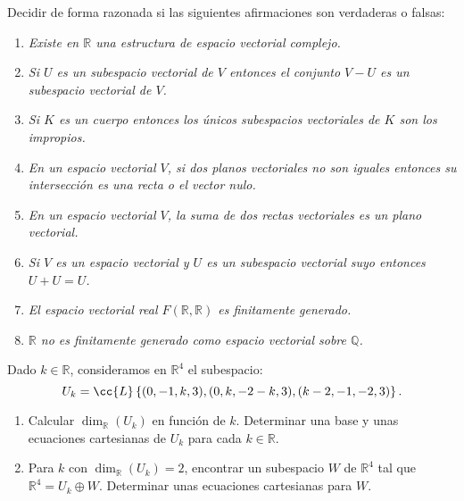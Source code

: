 \begin{ejercicio}
	Decidir de forma razonada si las siguientes afirmaciones son verdaderas o falsas:
	\begin{enumerate}
		\item \textit{Existe en $\mathbb{R}$ una estructura de espacio vectorial complejo.}
		\item \textit{Si $U$ es un subespacio vectorial de $V$ entonces el conjunto $V - U$ es un subespacio vectorial de $V$.}
		\item \textit{Si $K$ es un cuerpo entonces los únicos subespacios vectoriales de $K$ son los impropios.}
		\item \textit{En un espacio vectorial $V$, si dos planos vectoriales no son iguales entonces su intersección es una recta o el vector nulo.}
		\item \textit{En un espacio vectorial $V$, la suma de dos rectas vectoriales es un plano vectorial.}
		\item \textit{Si $V$ es un espacio vectorial y $U$ es un subespacio vectorial suyo entonces $U + U = U$.}
		\item \textit{El espacio vectorial real $F(\mathbb{R}, \mathbb{R})$ es finitamente generado.}
		\item \textit{$\mathbb{R}$ no es finitamente generado como espacio vectorial sobre $\mathbb{Q}$.}
	\end{enumerate}
\end{ejercicio}

\begin{ejercicio}
	Dado $k \in \mathbb{R}$, consideramos en $\mathbb{R}^4$ el subespacio:
	\[
		U_k = \cc{L}\left\{ (0, -1, k, 3), (0, k, -2 - k, 3), (k-2, -1, -2, 3) \right\}.
	\]
	\begin{enumerate}
		\item Calcular $\dim_{\mathbb{R}}(U_k)$ en función de $k$. Determinar una base y unas ecuaciones cartesianas de $U_k$ para cada $k \in \mathbb{R}$.
		\item Para $k$ con $\dim_{\mathbb{R}}(U_k) = 2$, encontrar un subespacio $W$ de $\mathbb{R}^4$ tal que $\mathbb{R}^4 = U_k \oplus W$. Determinar unas ecuaciones cartesianas para $W$.
	\end{enumerate}
\end{ejercicio}
\newpage
